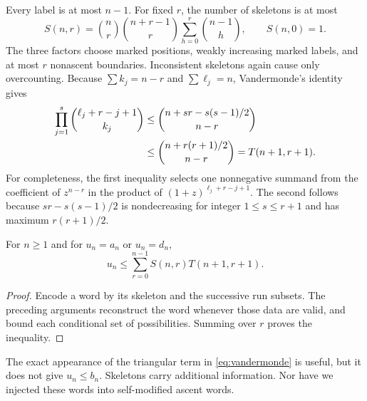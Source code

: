 Every label is at most $n-1$. For fixed $r$, the number of skeletons is at most
\begin{equation}\label{eq:skeleton}
 S(n,r)=\binom nr\binom{n+r-1}{r}
          \sum_{h=0}^r\binom{n-1}{h},\qquad S(n,0)=1.
\end{equation}
The three factors choose marked positions, weakly increasing marked labels, and at most $r$ nonascent boundaries. Inconsistent skeletons again cause only overcounting. Because $\sum k_j=n-r$ and $\sum\ell_j=n$, Vandermonde's identity gives
\begin{align}
 \prod_{j=1}^s\binom{\ell_j+r-j+1}{k_j}
 &\le\binom{n+sr-s(s-1)/2}{n-r}\notag\\
 &\le\binom{n+r(r+1)/2}{n-r}
   =T(n+1,r+1).\label{eq:vandermonde}
\end{align}
For completeness, the first inequality selects one nonnegative summand from the coefficient of $z^{n-r}$ in the product of $(1+z)^{\ell_j+r-j+1}$. The second follows because $sr-s(s-1)/2$ is nondecreasing for integer $1\le s\le r+1$ and has maximum $r(r+1)/2$.

\begin{proposition}\label{prop:finiteupper}
For $n\ge1$ and for $u_n=a_n$ or $u_n=d_n$,
\begin{equation}\label{eq:finiteupper}
 u_n\le\sum_{r=0}^{n-1}S(n,r)T(n+1,r+1).
\end{equation}
\end{proposition}
\begin{proof}
Encode a word by its skeleton and the successive run subsets. The preceding arguments reconstruct the word whenever those data are valid, and bound each conditional set of possibilities. Summing over $r$ proves the inequality.
\end{proof}
The exact appearance of the triangular term in \eqref{eq:vandermonde} is useful, but it does not give $u_n\le b_n$. Skeletons carry additional information. Nor have we injected these words into self-modified ascent words.
